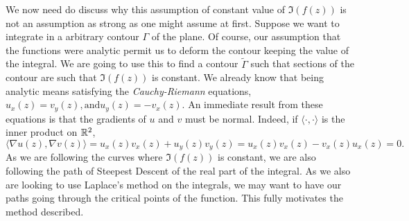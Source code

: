 We now need do discuss why this assumption of constant value of $\Im(f(z))$ is not an assumption as strong as one might assume at first. Suppose we want to integrate in a arbitrary contour $\Gamma$ of the plane. Of course, our assumption that the functions were analytic permit us to deform the contour keeping the value of the integral. We are going to use this to find a contour $\tilde{\Gamma}$ such that sections of the contour are such that $\Im(f(z))$ is constant. We already know that being analytic means satisfying the \textit{Cauchy-Riemann} equations,
$
	u_x(z) = v_y(z), \text{and} u_y(z) = -v_x(z).
$
An immediate result from these equations is that the gradients of $u$ and $v$ must be normal. Indeed, if $\langle \cdot, \cdot \rangle$ is the inner product on $\mathbb{R}^2$,
$$\langle \nabla u(z), \nabla v(z) \rangle = u_x(z)v_x(z) + u_y(z)v_y(z) = u_x(z)v_x(z) - v_x(z)u_x(z) = 0.$$
As we are following the curves where  $\Im(f(z))$ is constant, we are also following the path of Steepest Descent of the real part of the integral. As we also are looking to use Laplace's method on the integrals, we may want to have our paths going through the critical points of the function. This fully motivates the method described.


